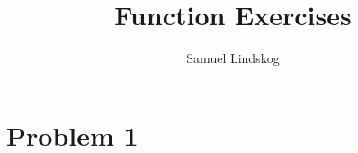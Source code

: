 \documentclass{article}
\theoremstyle{plain}
\theoremstyle{definition}
\begin{document}
\title{Function Exercises}
\author{Samuel Lindskog}
\maketitle

\setcounter{section}{1}

\section*{Problem 1}
\end{document}
